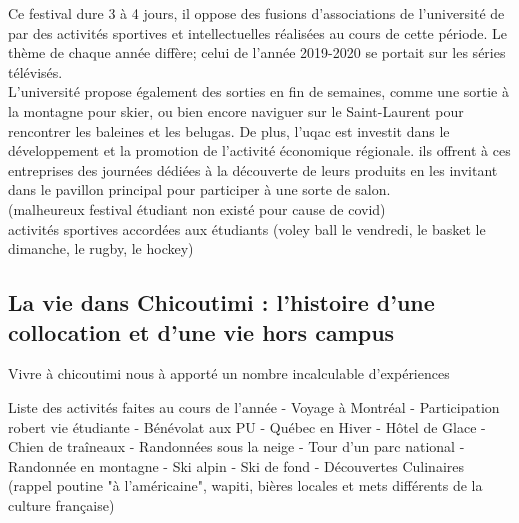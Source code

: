 Ce festival dure 3 à 4 jours, il oppose des fusions d'associations de l'université de par des activités sportives et intellectuelles réalisées au cours de cette période. Le thème de chaque année diffère; celui de l'année 2019-2020 se portait sur les séries télévisés.\\

L'université propose également des sorties en fin de semaines, comme une sortie à la montagne pour
skier, ou bien encore naviguer sur le Saint-Laurent pour rencontrer les baleines et les belugas.
De plus, l'uqac est investit dans le développement et la promotion de l'activité économique régionale. ils offrent à ces entreprises des journées dédiées à la découverte de leurs produits en les invitant dans le pavillon principal pour participer à une sorte de salon.\\

(malheureux festival étudiant non existé pour cause de covid)\\
activités sportives accordées aux étudiants (voley ball le vendredi, le basket le dimanche, le rugby, le hockey)


\subsection{La vie dans Chicoutimi : l'histoire d'une collocation et d'une vie hors campus}

Vivre à chicoutimi nous à apporté un nombre incalculable d'expériences 

Liste des activités faites au cours de l'année 
- Voyage à Montréal
- Participation robert vie étudiante
- Bénévolat aux PU
- Québec en Hiver
- Hôtel de Glace
- Chien de traîneaux 
- Randonnées sous la neige
- Tour d'un parc national
- Randonnée en montagne
- Ski alpin
- Ski de fond
- Découvertes Culinaires (rappel poutine "à l'américaine", wapiti, bières locales et mets différents de la culture française)




